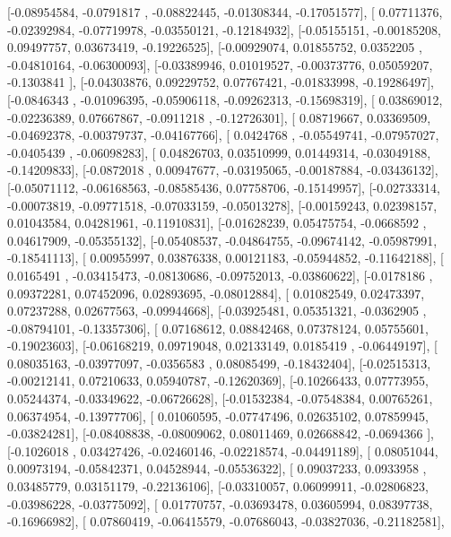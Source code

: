 \documentclass{article}
\begin{document}
       [-0.08954584, -0.0791817 , -0.08822445, -0.01308344, -0.17051577],
       [ 0.07711376, -0.02392984, -0.07719978, -0.03550121, -0.12184932],
       [-0.05155151, -0.00185208,  0.09497757,  0.03673419, -0.19226525],
       [-0.00929074,  0.01855752,  0.0352205 , -0.04810164, -0.06300093],
       [-0.03389946,  0.01019527, -0.00373776,  0.05059207, -0.1303841 ],
       [-0.04303876,  0.09229752,  0.07767421, -0.01833998, -0.19286497],
       [-0.0846343 , -0.01096395, -0.05906118, -0.09262313, -0.15698319],
       [ 0.03869012, -0.02236389,  0.07667867, -0.0911218 , -0.12726301],
       [ 0.08719667,  0.03369509, -0.04692378, -0.00379737, -0.04167766],
       [ 0.0424768 , -0.05549741, -0.07957027, -0.0405439 , -0.06098283],
       [ 0.04826703,  0.03510999,  0.01449314, -0.03049188, -0.14209833],
       [-0.0872018 ,  0.00947677, -0.03195065, -0.00187884, -0.03436132],
       [-0.05071112, -0.06168563, -0.08585436,  0.07758706, -0.15149957],
       [-0.02733314, -0.00073819, -0.09771518, -0.07033159, -0.05013278],
       [-0.00159243,  0.02398157,  0.01043584,  0.04281961, -0.11910831],
       [-0.01628239,  0.05475754, -0.0668592 ,  0.04617909, -0.05355132],
       [-0.05408537, -0.04864755, -0.09674142, -0.05987991, -0.18541113],
       [ 0.00955997,  0.03876338,  0.00121183, -0.05944852, -0.11642188],
       [ 0.0165491 , -0.03415473, -0.08130686, -0.09752013, -0.03860622],
       [-0.0178186 ,  0.09372281,  0.07452096,  0.02893695, -0.08012884],
       [ 0.01082549,  0.02473397,  0.07237288,  0.02677563, -0.09944668],
       [-0.03925481,  0.05351321, -0.0362905 , -0.08794101, -0.13357306],
       [ 0.07168612,  0.08842468,  0.07378124,  0.05755601, -0.19023603],
       [-0.06168219,  0.09719048,  0.02133149,  0.0185419 , -0.06449197],
       [ 0.08035163, -0.03977097, -0.0356583 ,  0.08085499, -0.18432404],
       [-0.02515313, -0.00212141,  0.07210633,  0.05940787, -0.12620369],
       [-0.10266433,  0.07773955,  0.05244374, -0.03349622, -0.06726628],
       [-0.01532384, -0.07548384,  0.00765261,  0.06374954, -0.13977706],
       [ 0.01060595, -0.07747496,  0.02635102,  0.07859945, -0.03824281],
       [-0.08408838, -0.08009062,  0.08011469,  0.02668842, -0.0694366 ],
       [-0.1026018 ,  0.03427426, -0.02460146, -0.02218574, -0.04491189],
       [ 0.08051044,  0.00973194, -0.05842371,  0.04528944, -0.05536322],
       [ 0.09037233,  0.0933958 ,  0.03485779,  0.03151179, -0.22136106],
       [-0.03310057,  0.06099911, -0.02806823, -0.03986228, -0.03775092],
       [ 0.01770757, -0.03693478,  0.03605994,  0.08397738, -0.16966982],
       [ 0.07860419, -0.06415579, -0.07686043, -0.03827036, -0.21182581],
\end{document}
